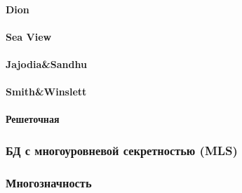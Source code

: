 \paragraph{Dion}
\paragraph{Sea View}
\paragraph{Jajodia\&Sandhu}
\paragraph{Smith\&Winslett}
\paragraph{Решеточная}

\subsubsection{БД с многоуровневой секретностью (MLS)}
\subsubsection{Многозначность}